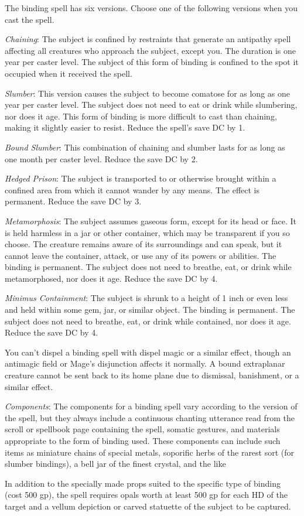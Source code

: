 {	The binding spell has six versions. Choose one of the following versions when you cast the spell.

	\textit{Chaining}:
	The subject is confined by restraints that generate an antipathy spell affecting all creatures who approach the subject, except you. The duration is one year per caster level. The subject of this form of binding is confined to the spot it occupied when it received the spell.

	\textit{Slumber}:
	This version causes the subject to become comatose for as long as one year per caster level. The subject does not need to eat or drink while slumbering, nor does it age. This form of binding is more difficult to cast than chaining, making it slightly easier to resist. Reduce the spell's save DC by 1.

	\textit{Bound Slumber}:
	This combination of chaining and slumber lasts for as long as one month per caster level. Reduce the save DC by 2.

	\textit{Hedged Prison}:
	The subject is transported to or otherwise brought within a confined area from which it cannot wander by any means. The effect is permanent. Reduce the save DC by 3.

	\textit{Metamorphosis}:
	The subject assumes gaseous form, except for its head or face. It is held harmless in a jar or other container, which may be transparent if you so choose. The creature remains aware of its surroundings and can speak, but it cannot leave the container, attack, or use any of its powers or abilities. The binding is permanent. The subject does not need to breathe, eat, or drink while metamorphosed, nor does it age. Reduce the save DC by 4.

	\textit{Minimus Containment}:
	The subject is shrunk to a height of 1 inch or even less and held within some gem, jar, or similar object. The binding is permanent. The subject does not need to breathe, eat, or drink while contained, nor does it age. Reduce the save DC by 4.

	You can't dispel a binding spell with dispel magic or a similar effect, though an antimagic field or Mage's disjunction affects it normally. A bound extraplanar creature cannot be sent back to its home plane due to dismissal, banishment, or a similar effect.

	\textit{Components}:
	The components for a binding spell vary according to the version of the spell, but they always include a continuous chanting utterance read from the scroll or spellbook page containing the spell, somatic gestures, and materials appropriate to the form of binding used. These components can include such items as miniature chains of special metals, soporific herbs of the rarest sort (for slumber bindings), a bell jar of the finest crystal, and the like

	In addition to the specially made props suited to the specific type of binding (cost 500 gp), the spell requires opals worth at least 500 gp for each HD of the target and a vellum depiction or carved statuette of the subject to be captured.

}
